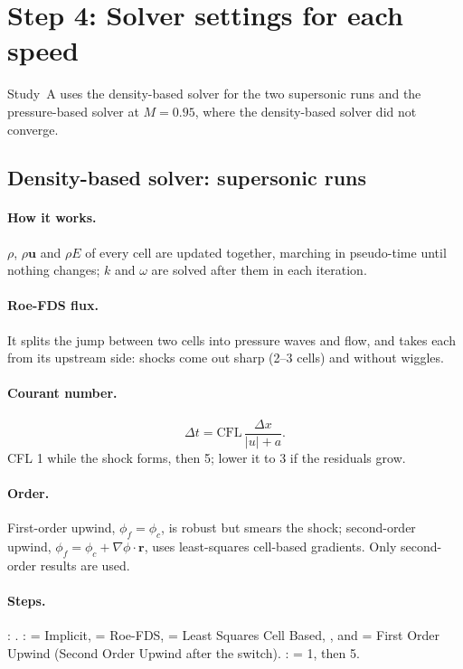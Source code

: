 \section{Step 4: Solver settings for each speed}
\label{sec:solver}

Study~A uses the density-based solver for the two supersonic runs and the pressure-based solver at
$M = 0.95$, where the density-based solver did not converge.

\subsection{Density-based solver: supersonic runs}

\paragraph{How it works.} $\rho$, $\rho\mathbf u$ and $\rho E$ of every cell are updated together,
marching in pseudo-time until nothing changes; $k$ and $\omega$ are solved after them in each iteration.

\paragraph{Roe-FDS flux.} It splits the jump between two cells into pressure waves and flow, and takes each
from its upstream side: shocks come out sharp (2--3 cells) and without wiggles.

\paragraph{Courant number.}
\begin{equation}
\Delta t = \mathrm{CFL}\,\frac{\Delta x}{|u| + a}.
\end{equation}
CFL 1 while the shock forms, then 5; lower it to 3 if the residuals grow.

\paragraph{Order.} First-order upwind, $\phi_f = \phi_c$, is robust but smears the shock; second-order
upwind, $\phi_f = \phi_c + \nabla\phi\cdot\mathbf r$, uses least-squares cell-based gradients. Only
second-order results are used.

\paragraph{Steps.} : . :  = Implicit,
 = Roe-FDS,  = Least Squares Cell Based, ,  and  = First Order Upwind (Second Order Upwind after the switch).
:  = 1, then 5.

